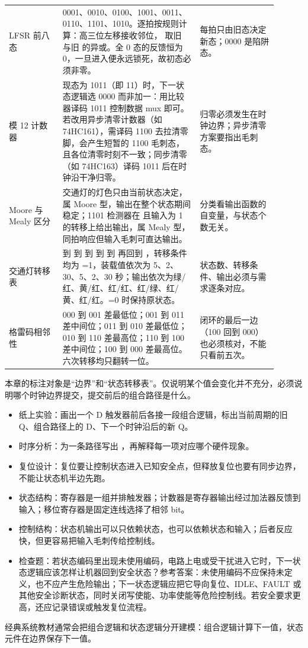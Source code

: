 \begin{longtable}{L{0.18\linewidth}L{0.46\linewidth}L{0.26\linewidth}}
LFSR 前八态 & 0001、0010、0100、1001、0011、0110、1101、1010。逐拍按规则计算：高三位左移接收邻位， 取旧  与旧  的异或。全 0 态的反馈恒为 0，一旦进入便永远锁死，故初态必须非零。 & 每拍只由旧态决定新态；0000 是陷阱态。 \\
模 12 计数器 & 现态为 1011（即 11）时，下一状态逻辑选 0000 而非加一：用比较器译码 1011 控制数据 mux 即可。若改用异步清零计数器（如 74HC161），需译码 1100 去拉清零脚，会产生短暂的 1100 毛刺态，且各位清零时刻不一致；同步清零（如 74HC163）译码 1011 后在时钟沿干净归零。 & 归零必须发生在时钟边界；异步清零方案要指出毛刺态。 \\
Moore 与 Mealy 区分 & 交通灯的灯色只由当前状态决定，属 Moore 型，输出在整个状态期间稳定；1101 检测器在  且输入为 1 的转移上给出输出，属 Mealy 型，同拍响应但输入毛刺可直达输出。 & 分类看输出函数的自变量，与状态个数无关。 \\
交通灯转移表 &  到  到  到  到  到  再回到 ，转移条件均为 =1，装载值依次为 5、2、30、5、2、30 秒；输出依次为绿/红、黄/红、红/红、红/绿、红/黄、红/红。=0 时保持原状态。 & 状态数、转移条件、输出必须与需求逐条对应。 \\
格雷码相邻性 & 000 到 001 差最低位；001 到 011 差中间位；011 到 010 差最低位；010 到 110 差最高位；110 到 100 差中间位；100 到 000 差最高位。六次转移均只翻转一位。 & 闭环的最后一边（100 回到 000）也必须核对，不能只看前五次。 \\
\bottomrule
\end{longtable}

\begin{classicnote}
本章的标注对象是“边界”和“状态转移表”。仅说明某个值会变化并不充分，必须说明哪个时钟边界提交，提交前后的组合路径是什么。

\begin{itemize}
\item 纸上实验：画出一个 D 触发器前后各接一段组合逻辑，标出当前周期的旧 Q、组合路径上的 D、下一个时钟沿后的新 Q。
\item 时序分析：为一条路径写出 ，再解释每一项对应哪个硬件现象。
\item 复位设计：复位要让控制状态进入已知安全点，但释放复位也要有同步边界，不能让状态机半边先跑。
\item 状态结构：寄存器是一组并排触发器；计数器是寄存器输出经过加法器反馈到输入；移位寄存器是固定连线选择了相邻 bit。
\item 控制结构：状态机输出可以只依赖状态，也可以依赖状态和输入；后者反应快，但更容易把输入毛刺传给控制线。
\item 检查题：若状态编码里出现未使用编码，电路上电或受干扰进入它时，下一状态逻辑应该怎样让机器回到安全状态？参考答案：未使用编码不应保持未定义，也不应产生危险输出；下一状态逻辑应把它导向复位、IDLE、FAULT 或其他安全诊断状态，同时关闭写使能、功率使能等危险控制线。若安全要求更高，还应记录错误或触发复位流程。
\end{itemize}

经典系统教材通常会把组合逻辑和状态逻辑分开建模：组合逻辑计算下一值，状态元件在边界保存下一值。
\end{classicnote}

